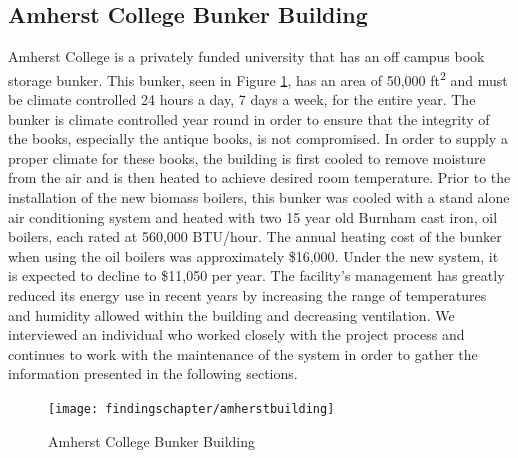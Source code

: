 \subsection{Amherst College Bunker Building}
\par Amherst College is a privately funded university that has an off campus book storage bunker. This bunker, seen in Figure \ref{fig:bunker}, has an area of 50,000 ft\textsuperscript{2} and must be climate controlled 24 hours a day, 7 days a week, for the entire year. The bunker is climate controlled year round in order to ensure that the integrity of the books, especially the antique books, is not compromised. In order to supply a proper climate for these books, the building is first cooled to remove moisture from the air and is then heated to achieve desired room temperature. Prior to the installation of the new biomass boilers, this bunker was cooled with a stand alone air conditioning system and heated with two 15 year old Burnham cast iron, oil boilers, each rated at 560,000 BTU/hour. The annual heating cost of the bunker when using the oil boilers was approximately \$16,000. Under the new system, it is expected to decline to \$11,050 per year. The facility's management has greatly reduced its energy use in recent years by increasing the range of temperatures and humidity allowed within the building and decreasing ventilation. We interviewed an individual who worked closely with the project process and continues to work with the maintenance of the system in order to gather the information presented in the following sections.
\begin{figure}[H]
\centering
\texttt{[image: findingschapter/amherstbuilding]}
\caption{Amherst College Bunker Building}
\label{fig:bunker}
\end{figure}

